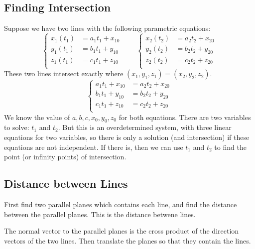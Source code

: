 \documentclass{article}
\begin{document}
\subsection{Finding Intersection}
Suppose we have two lines with the following parametric equations:
\begin{equation*}
	\left\{\begin{aligned}
		x_1(t_1)&=a_1t_1+x_{10} \\
		y_1(t_1)&=b_1t_1+y_{10} \\
		z_1(t_1)&=c_1t_1+z_{10} \\
	\end{aligned}\right.
	\qquad
	\left\{\begin{aligned}
		x_2(t_2)&=a_2t_2+x_{20} \\
		y_2(t_2)&=b_2t_2+y_{20} \\
		z_2(t_2)&=c_2t_2+z_{20} \\
	\end{aligned}\right.
\end{equation*}
These two lines intersect exactly where $(x_1,y_1,z_1)=(x_2,y_2,z_2)$.
\begin{equation*}
	\left\{\begin{aligned}
		a_1t_1+x_{10}&=a_2t_2+x_{20} \\
		b_1t_1+y_{10}&=b_2t_2+y_{20} \\
		c_1t_1+z_{10}&=c_2t_2+z_{20} \\
	\end{aligned}\right.
\end{equation*}
We know the value of $a,b,c,x_0,y_0,z_0$ for both equations. There are two variables to solve: $t_1$ and $t_2$. But this is an overdetermined system, with three linear equations for two variables, so there is only a solution (and intersection) if these equations are not independent. If there is, then we can use $t_1$ and $t_2$ to find the point (or infinity points) of intersection.

\subsection{Distance between Lines}

First find two parallel planes which contains each line, and find the distance between the parallel planes. This is the distance betwene lines.

The normal vector to the parallel planes is the cross product of the direction vectors of the two lines. Then translate the planes so that they contain the lines.
\end{document}
